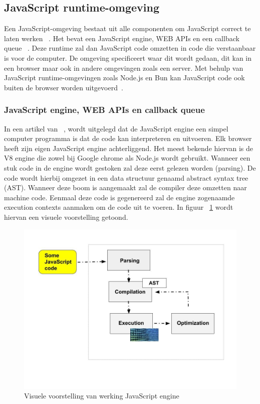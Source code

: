 \subsection{JavaScript runtime-omgeving}
Een JavaScript-omgeving bestaat uit alle componenten om JavaScript correct te laten werken ~\autocite{Christopher}. 
Het bevat een JavaScript engine, WEB APIs en een callback queue ~\autocite{Christopher}. 
Deze runtime zal dan JavaScript code omzetten in code die verstaanbaar is voor de computer.
De omgeving specificeert waar dit wordt gedaan, dit kan in een browser maar ook in andere omgevingen zoals een server.
Met behulp van JavaScript runtime-omgevingen zoals Node.js en Bun kan JavaScript code ook buiten de browser worden uitgevoerd~\autocite{Mozilla2023}.

\subsubsection{JavaScript engine, WEB APIs en callback queue}

In een artikel van ~\textcite{Christopher}, 
wordt uitgelegd dat de JavaScript engine een simpel computer programma is dat de code kan interpreteren en uitvoeren.
Elk browser heeft zijn eigen JavaScript engine achterliggend. Het meest bekende hiervan is de
V8 engine die zowel bij Google chrome als Node.js wordt gebruikt. 
Wanneer een stuk code in de engine wordt gestoken zal deze eerst gelezen worden (parsing). 
De code wordt hierbij omgezet in een data structuur genaamd abstract syntax tree (AST).
Wanneer deze boom is aangemaakt zal de compiler deze omzetten naar machine code. 
Eenmaal deze code is gegenereerd zal de engine zogenaamde execution contexts aanmaken om de code uit te voeren.
In figuur ~\ref{fig:JavaScriptengine} wordt hiervan een visuele voorstelling getoond.
\begin{figure}[H]
    \centering
    \includegraphics[width=.9\textwidth]{graphics/javascriptengine.jpeg}
    \caption{\label{fig:JavaScriptengine}Visuele voorstelling van werking JavaScript engine ~\autocite{Christopher}}
\end{figure}

